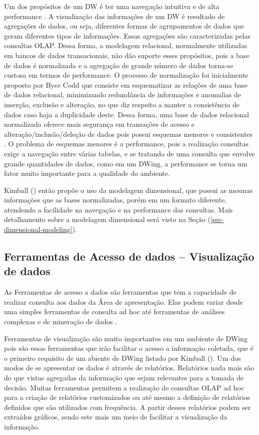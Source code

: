 Um dos propósitos de um DW é ter uma navegação intuitiva e de alta performance \cite{kimball2002}. A visualização das informações de um DW é resultado de agregações de dados, ou seja, diferentes formas de agrupamentos de dados que geram diferentes tipos de informações. Essas agregações são caracterizadas pelas consultas OLAP. Dessa forma, a modelagem relacional, normalmente utilizadas em bancos de dados transacionais, não dão suporte esses propósitos, pois a base de dados é normalizada e a agregação de grande número de dados torna-se custosa em termos de performance. O processo de normalização foi inicialmente proposto por Byce Codd  que consiste em esquematizar as relações de uma base de dados relacional, minimizando redundância de informações e anomalias de inserção, exclusão e alteração, no que diz respeito a manter a consistência de dados caso haja a duplicidade deste. Dessa forma, uma base de dados relacional normalizada oferece mais segurança em transações de acesso e alteração/inclusão/deleção de dados pois possui esquemas menores e consistentes \cite{elmasri2006}. O problema de esquemas menores é a performance, pois a realização consultas exige a navegação  entre várias tabelas, e se tratando de uma consulta que envolve grande quantidades de dados, como em um DWing, a performance se torna um fator muito importante para a qualidade do ambiente.

%

Kimball (\citeyear{kimball2002}) então propõe o uso da modelagem dimensional, que possui as mesmas informações que as bases normalizadas, porém em um formato diferente, atendendo a facilidade na navegação e na performance das consultas. Mais detalhamento sobre a modelagem dimensional será visto na Seção (\ref{sec-dimensional-modeling}).

%

\subsection{Ferramentas de Acesso de dados – Visualização de dados}

%

As Ferramentas de acesso a dados são ferramentas que tem a capacidade de realizar consulta aos dados da Área de apresentação. Elas podem variar desde uma simples ferramentas de consulta ad hoc até ferramentas de análises complexas e de mineração de dados \cite{kimball2002}.

%

Ferramentas de visualização são muito importantes em um ambiente de DWing pois são essas ferramentas que irão facilitar o acesso a informação coletada, que é o primeiro requisito de um abiente de DWing listado por Kimball (\citeyear{kimball2002}). Um dos modos de se apresentar os dados é através de relatórios. Relatórios nada mais são do que vistas agregadas da informação que sejam relevantes para a tomada de decisão. Muitas ferramentas permitem a realização de consultas OLAP ad hoc para a criação de relatórios customizados ou até mesmo a definição de relatórios definidos que são utilizados com frequência. A partir desses relatórios podem ser extraídos gráficos, sendo este mais um meio de facilitar a visualização da informação. 

